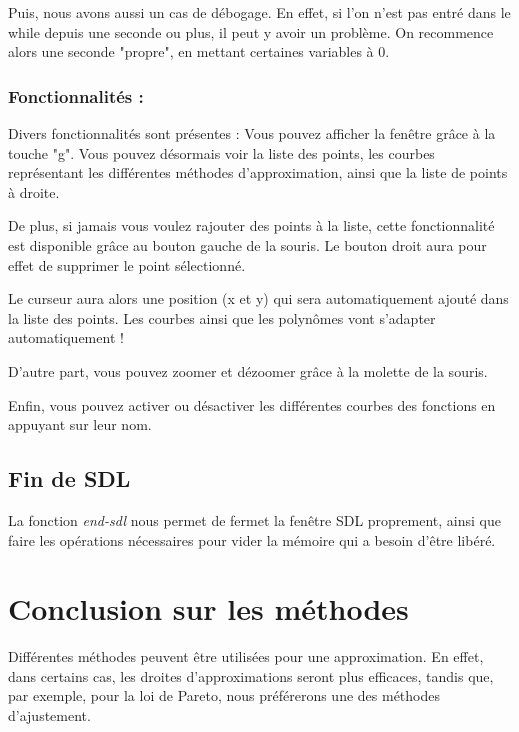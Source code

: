 \documentclass[letter]{article}
\begin{document}
Puis, nous avons aussi un cas de débogage. En effet, si l'on n'est pas entré dans le while depuis une seconde ou plus, il peut y avoir un problème. On recommence alors une seconde "propre", en mettant certaines variables à 0.








\subsubsection{Fonctionnalités :}
\label{sec:org24f32e4}

Divers fonctionnalités sont présentes :
Vous pouvez afficher la fenêtre grâce à la touche "g". Vous pouvez désormais voir la liste des points, les courbes représentant les différentes méthodes d'approximation, ainsi que la liste de points à droite.

De plus, si jamais vous voulez rajouter des points à la liste, cette fonctionnalité est disponible grâce au bouton gauche de la souris. Le bouton droit aura pour effet de supprimer le point sélectionné.

Le curseur aura alors une position (x et y) qui sera automatiquement ajouté dans la liste des points. Les courbes ainsi que les polynômes vont s'adapter automatiquement !

D'autre part, vous pouvez zoomer et dézoomer grâce à la molette de la souris.

Enfin, vous pouvez activer ou désactiver les différentes courbes des fonctions en appuyant sur leur nom. 


\subsection{Fin de SDL}
\label{sec:org604d217}

La fonction \emph{end-sdl} nous permet de fermet la fenêtre SDL proprement, ainsi que faire les opérations nécessaires pour vider la mémoire qui a besoin d'être libéré.


\section{Conclusion sur les méthodes}
\label{sec:org4bafc51}

Différentes méthodes peuvent être utilisées pour une approximation. En effet, dans certains cas, les droites d'approximations seront plus efficaces, tandis que, par exemple, pour la loi de Pareto, nous préférerons une des méthodes d'ajustement.
\end{document}
